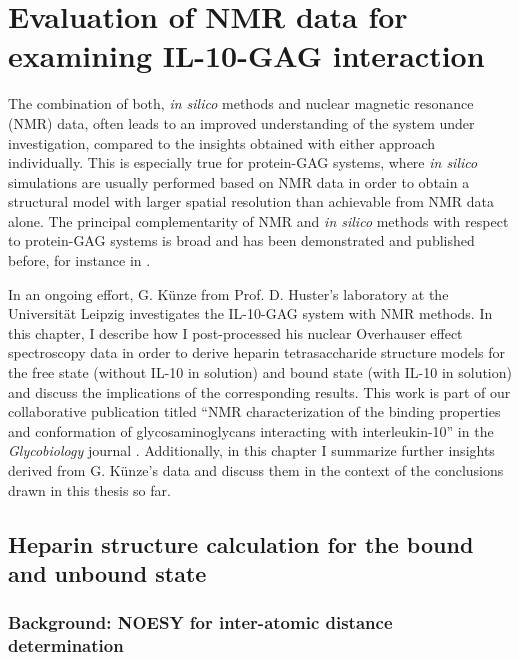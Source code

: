 \chapter{Evaluation of NMR data for examining IL-10-GAG interaction}

The combination of both, \textit{in silico} methods and nuclear magnetic
resonance (NMR) data, often leads to an improved understanding of the system
under investigation, compared to the insights obtained with either approach
individually. This is especially true for protein-GAG systems, where \textit{in
silico} simulations are usually performed based on NMR data in order to obtain a
structural model with larger spatial resolution than achievable from NMR data
alone. The principal complementarity of NMR and \textit{in silico} methods with
respect to protein-GAG systems is broad and has been demonstrated and published
before, for instance in \cite{pichert_characterization_2012, sost_heparin_2009,
nieto_conf_selection_heparin_2011}.

In an ongoing effort, G. Künze from Prof. D. Huster's laboratory at the
Universität Leipzig investigates the IL-10-GAG system with NMR methods. In this
chapter, I describe how I post-processed his nuclear Overhauser effect
spectroscopy data in order to derive heparin tetrasaccharide structure models
for the free state (without IL-10 in solution) and bound state (with IL-10 in
solution) and discuss the implications of the corresponding results. This work
is part of our collaborative publication titled \enquote{NMR characterization of
the binding properties and conformation of glycosaminoglycans interacting with
interleukin-10} in the \textit{Glycobiology} journal \cite{kuenze_gehrcke_2014}.
Additionally, in this chapter I summarize further insights derived from G.
Künze's data and discuss them in the context of the conclusions drawn in this
thesis so far.


\section{Heparin structure calculation for the bound and unbound state}

\subsection{Background: NOESY for inter-atomic distance determination}
\label{nmr:noesy_background}

